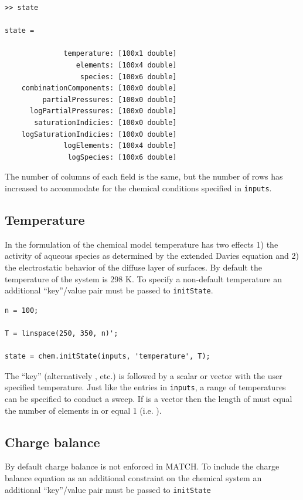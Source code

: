 \documentclass{article}
\begin{document}
\begin{lstlisting}
>> state

state = 

              temperature: [100x1 double]
                 elements: [100x4 double]
                  species: [100x6 double]
    combinationComponents: [100x0 double]
         partialPressures: [100x0 double]
      logPartialPressures: [100x0 double]
       saturationIndicies: [100x0 double]
    logSaturationIndicies: [100x0 double]
              logElements: [100x4 double]
               logSpecies: [100x6 double]

\end{lstlisting}
The number of columns of each field is the same, but the number of rows has increased to accommodate for the chemical conditions specified in \verb|inputs|.

\subsection{Temperature}

In the formulation of the chemical model temperature has two effects 1) the activity of aqueous species as determined by the extended Davies equation and 2) the electrostatic behavior of the diffuse layer of surfaces. By default the temperature of the system is 298 \textdegree K. To specify a non-default temperature an additional ``key''/value pair must be passed to \verb|initState|. 
\begin{lstlisting}
n = 100;

T = linspace(250, 350, n)';

state = chem.initState(inputs, 'temperature', T);
\end{lstlisting}
The ``key''  (alternatively ,  etc.) is followed by a scalar or vector with the user specified temperature. Just like the entries in \verb|inputs|, a range of temperatures can be specified to conduct a sweep. If  is a vector then the length of  must equal the number of elements in  or equal 1 (i.e.  ).

\subsection{Charge balance}
By default charge balance is not enforced in MATCH. To include the charge balance equation as an additional constraint on the chemical system an additional ``key''/value pair must be passed to \verb|initState|
\end{document}
